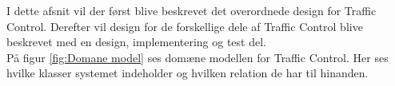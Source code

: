 I dette afsnit vil der først blive beskrevet det overordnede design for Traffic Control. Derefter vil design for de forskellige dele af Traffic Control blive beskrevet med en design, implementering og test del. \\
På figur \ref{fig:Domane model} ses domæne modellen for Traffic Control. Her ses hvilke klasser systemet indeholder og hvilken relation de har til hinanden.


\pagebreak